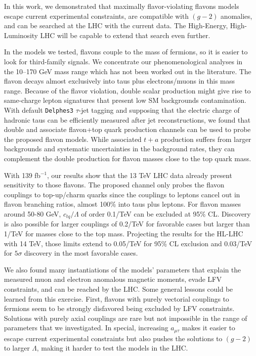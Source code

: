 \documentclass[prd,amsfonts,onecolumn,superscriptaddress,aps,nofootinbib,11pt]{revtex4-1}
\begin{document}
 In this work, we demonstrated that maximally flavor-violating flavons models escape current experimental constraints, are compatible with $(g-2)$ anomalies, and can be searched at the LHC with the current data. The High-Energy, High-Luminosity LHC will be capable to extend that search even further.

 In the models we tested, flavons couple to the mass of fermions, so it is easier to look for third-family signals. We concentrate our phenomenological analyses in the 10--170 GeV mass range which has not been worked out in the literature. The flavon decays almost exclusively into taus plus electrons/muons in this mass range. Because of the flavor violation, double scalar production might give rise to same-charge lepton signatures that present low SM backgrounds contamination. With default \texttt{Delphes3} $\tau$-jet tagging and supposing that the electric charge of hadronic taus can be efficiently measured after jet reconstructions, we found that double and associate flavon+top quark production channels can be used to probe the proposed flavon models. While associated $t+a$ production suffers from larger backgrounds and systematic uncertainties in the background rates, they can complement the double production for flavon masses close to the top quark mass.

 With 139 fb$^{-1}$, our results show that the 13 TeV LHC data already present sensitivity to those flavons. The proposed channel only probes the flavon couplings to top-up/charm quarks since the couplings to leptons cancel out in flavon branching ratios, almost 100\% into taus plus leptons. For flavon masses around 50-80 GeV, $c_{tq}/\Lambda$ of order 0.1/TeV can be excluded at 95\% CL. Discovery is also possible for larger couplings of 0.2/TeV for favorable cases but larger than 1/TeV for masses close to the top mass. Projecting the results for the HL-LHC with 14 TeV, those limits extend to 0.05/TeV for 95\% CL exclusion and 0.03/TeV for $5\sigma$ discovery in the most favorable cases. 

 We also found many instantiations of the models' parameters that explain the measured muon and electron anomalous magnetic moments, evade LFV constraints, and can be reached by the LHC. Some general lessons could be learned from this exercise. First, flavons with purely vectorial couplings to fermions seem to be strongly disfavored being excluded by LFV constraints. Solutions with purely axial couplings are rare but not impossible in the range of parameters that we investigated. In special, increasing $a_{\mu\tau}$ makes it easier to escape current experimental constraints but also pushes the solutions to $(g-2)$ to larger $\Lambda$, making it harder to test the models in the LHC.
\end{document}
